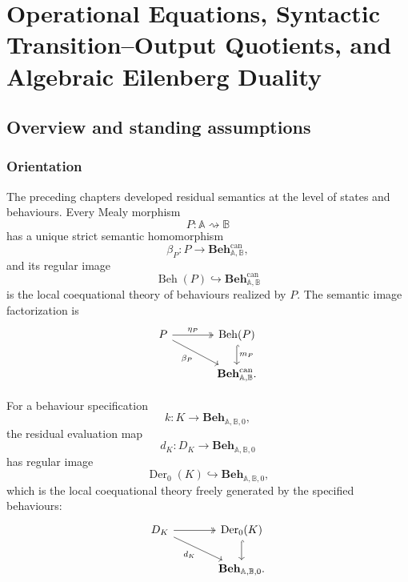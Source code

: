 \chapter{Operational Equations, Syntactic Transition--Output Quotients, and Algebraic Eilenberg Duality}
\label{ch:syntactic-transition-output-eilenberg}

\section{Overview and standing assumptions}
\label{sec:syntactic-to-overview-standing-assumptions}

\subsection{Orientation}
\label{subsec:syntactic-to-orientation}

The preceding chapters developed residual semantics at the level of states and
behaviours. Every Mealy morphism
\[
    P:\mathbb A\rightsquigarrow\mathbb B
\]
has a unique strict semantic homomorphism
\[
    \beta_P:
    P\to
    \mathbf{Beh}^{\mathrm{can}}_{\mathbb A,\mathbb B},
\]
and its regular image
\[
    \operatorname{Beh}(P)
    \hookrightarrow
    \mathbf{Beh}^{\mathrm{can}}_{\mathbb A,\mathbb B}
\]
is the local coequational theory of behaviours realized by \(P\). The
semantic image factorization is
\[
\begin{tikzcd}[column sep=large]
    P
        \arrow[r, two heads, "\eta_P"]
        \arrow[dr, "\beta_P"']
    &
    \operatorname{Beh}(P)
        \arrow[d, hook, "m_P"]
    \\
    &
    \mathbf{Beh}^{\mathrm{can}}_{\mathbb A,\mathbb B}.
\end{tikzcd}
\]

For a behaviour specification
\[
    k:K\to\mathbf{Beh}_{\mathbb A,\mathbb B,0},
\]
the residual evaluation map
\[
    d_K:D_K\to\mathbf{Beh}_{\mathbb A,\mathbb B,0}
\]
has regular image
\[
    \operatorname{Der}_0(K)
    \hookrightarrow
    \mathbf{Beh}_{\mathbb A,\mathbb B,0},
\]
which is the local coequational theory freely generated by the specified
behaviours:
\[
\begin{tikzcd}[column sep=large]
    D_K
        \arrow[r, two heads]
        \arrow[dr, "d_K"']
    &
    \operatorname{Der}_0(K)
        \arrow[d, hook]
    \\
    &
    \mathbf{Beh}_{\mathbb A,\mathbb B,0}.
\end{tikzcd}
\]

